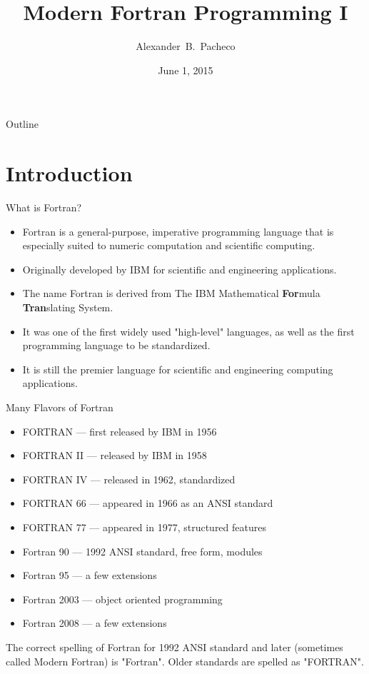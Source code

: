 \documentclass[10pt,t]{beamer}
\title{Modern Fortran Programming I}
\author[Alex Pacheco]{\large{Alexander~B.~Pacheco}}
\institute{\href{http://researchcomputing.lehigh.edu}{LTS Research Computing}}
\date{June 1, 2015}
\begin{document}
\frame{\titlepage}

\begin{frame}{Outline}
  \tableofcontents
\end{frame}


\section{Introduction}
\begin{frame}{What is Fortran?}
  \begin{itemize}
    \item Fortran is a general-purpose, imperative programming language that is especially suited to numeric computation and scientific computing.
    \item Originally developed by IBM for scientific and engineering applications.
    \item The name Fortran is derived from The IBM Mathematical \textbf{For}mula \textbf{Tran}slating System.
    \item It was one of the first widely used "high-level" languages, as well as the first programming language to be standardized. 
    \item It is still the premier language for scientific and engineering computing applications.
  \end{itemize}
\end{frame}

\begin{frame}{Many Flavors of Fortran}
  \begin{itemize}
    \item FORTRAN --- first released by IBM in 1956
    \item FORTRAN II --- released by IBM in 1958
    \item FORTRAN IV --- released in 1962, standardized
    \item FORTRAN 66 --- appeared in 1966 as an ANSI standard
    \item FORTRAN 77 --- appeared in 1977, structured features
    \item Fortran 90 --- 1992 ANSI standard, free form, modules
    \item Fortran 95 --- a few extensions
    \item Fortran 2003 --- object oriented programming
    \item Fortran 2008 --- a few extensions
  \end{itemize}
  The correct spelling of Fortran for 1992 ANSI standard and later (sometimes called Modern Fortran) is "Fortran". Older standards are spelled as "FORTRAN". 
\end{frame}
\end{document}
